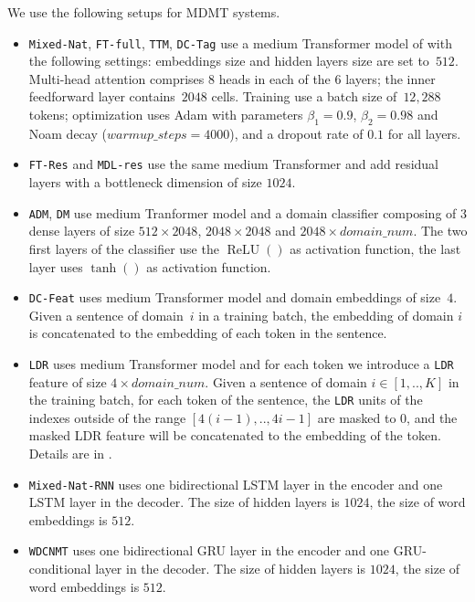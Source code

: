 \documentclass[12pt,a4paper,twoside]{report}
\theoremstyle{definition}
\newcommand{\system}[1]{\texttt{{#1}}}
\begin{document}
We use the following setups for MDMT systems.
\begin{itemize}
\item \system{Mixed-Nat}, \system{FT-full}, \system{TTM}, \system{DC-Tag} use a medium Transformer model of \cite{Vaswani17attention} with the following settings: embeddings size and hidden layers size are set to~$512$. Multi-head attention comprises 8 heads in each of the 6 layers; the inner feedforward layer contains~$2048$ cells. 
Training use a batch size of~$12,288$ tokens; optimization uses Adam with parameters $\beta_1=0.9$, $\beta_2= 0.98$ and Noam decay ($warmup\_steps=4000$), and a dropout rate of $0.1$ for all layers.
\item \system{FT-Res} and \system{MDL-res} use the same medium Transformer and add residual layers with a bottleneck dimension of size $1024$.
\item \system{ADM}, \system{DM} use medium Tranformer model and a domain classifier composing of 3 dense layers of size $512 \times 2048$, $2048 \times 2048$ and $2048 \times domain\_num$. The two first layers of the classifier use the $\operatorname{ReLU}()$ as activation function, the last layer uses $\tanh()$ as activation function.
\item \system{DC-Feat} uses medium Transformer model and domain embeddings of size~$4$. Given a sentence of domain~$i$ in a training batch, the embedding of domain $i$ is concatenated to the embedding of each token in the sentence.
\item \system{LDR} uses medium Transformer model and for each token we introduce a \system{LDR} feature of size $4 \times domain\_num$. Given a sentence of domain $i\in[1,..,K]$ in the training batch, for each token of the sentence, the \system{LDR} units of the indexes outside of the range $[4(i-1),..,4i-1]$ are masked to $0$, and the masked LDR feature will be concatenated to the embedding of the token. Details are in \cite{Pham19generic}.
\item \system{Mixed-Nat-RNN} uses one bidirectional LSTM layer in the encoder and one LSTM layer in the decoder. The size of hidden layers is $1024$, the size of word embeddings is $512$. 
\item \system{WDCNMT} uses one bidirectional GRU layer in the encoder and one GRU-conditional layer in the decoder. The size of hidden layers is $1024$, the size of word embeddings is $512$.
\end{itemize}
\end{document}
